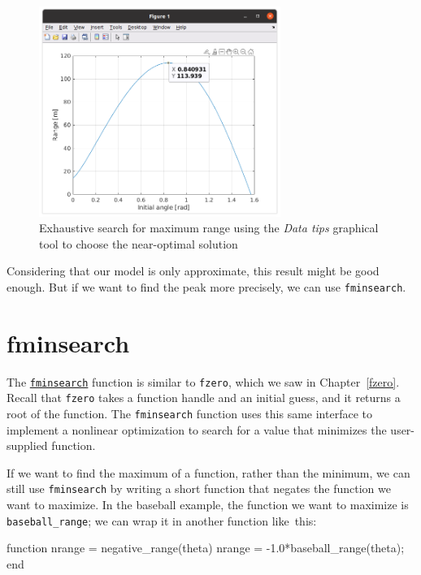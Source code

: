 \begin{figure}[h]
\centerline{\includegraphics[width=0.7\textwidth]{../code/chap_optimization/range_exhaustive.png}}
\caption{Exhaustive search for maximum range using the \emph{Data tips} graphical tool to choose the near-optimal solution}
\label{fig:baseball4}
\end{figure}


Considering that our model is only approximate, this result might be good enough.  But if we want to find the peak more precisely, we can use \lstinline{fminsearch}.


\section{fminsearch}

The \href{https://www.mathworks.com/help/matlab/ref/fminsearch.html}{\lstinline{fminsearch}} function is similar to \lstinline{fzero}, which we saw in Chapter~\ref{fzero}.  Recall that \lstinline{fzero} takes a function handle and an initial guess, and it returns a root of the function.  The \lstinline{fminsearch} function uses this same interface to implement a nonlinear optimization to search for a value that minimizes the user-supplied function.


If we want to find the maximum of a function, rather than the minimum, we can still use \lstinline{fminsearch} by writing a short function that negates the function we want to maximize.
In the baseball example, the function we want to maximize is \lstinline{baseball_range}; we can wrap it in another function like~this:

\begin{code}
function nrange = negative_range(theta)
nrange = -1.0*baseball_range(theta);
end
\end{code}

